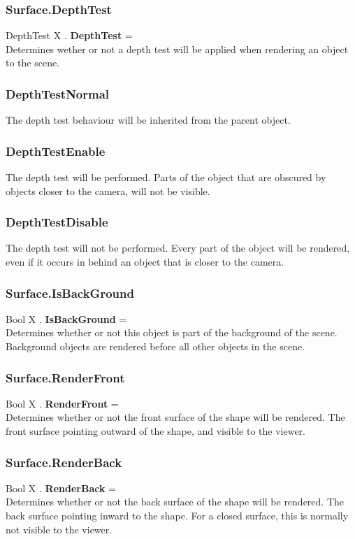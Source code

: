 \subsubsection{Surface.DepthTest \label{F:Surface:DepthTest}}
DepthTest X . \textbf{DepthTest} = \\
Determines wether or not a depth test will be applied when rendering an object to the scene.

\subsubsection{DepthTestNormal \label{T:DepthTest|DepthTestNormal}}
The depth test behaviour will be inherited from the parent object.

\subsubsection{DepthTestEnable \label{T:DepthTest|DepthTestEnable}}
The depth test will be performed. Parts of the object that are obscured by objects closer to the camera, will not be visible.

\subsubsection{DepthTestDisable \label{T:DepthTest|DepthTestDisable}}
The depth test will not be performed. Every part of the object will be rendered, even if it occurs in behind an object that is closer to the camera.

\subsubsection{Surface.IsBackGround \label{F:Surface:IsBackGround}}
Bool X . \textbf{IsBackGround} = \\
Determines whether or not this object is part of the background of the scene. Background objects are rendered before all other objects in the scene.

\subsubsection{Surface.RenderFront \label{F:Surface:RenderFront}}
Bool X . \textbf{RenderFront} = \\
Determines whether or not the front surface of the shape will be rendered. The front surface pointing outward of the shape, and visible to the viewer.

\subsubsection{Surface.RenderBack \label{F:Surface:RenderBack}}
Bool X . \textbf{RenderBack} = \\
Determines whether or not the back surface of the shape will be rendered. The back surface pointing inward to the shape. For a closed surface, this is normally not visible to the viewer.


